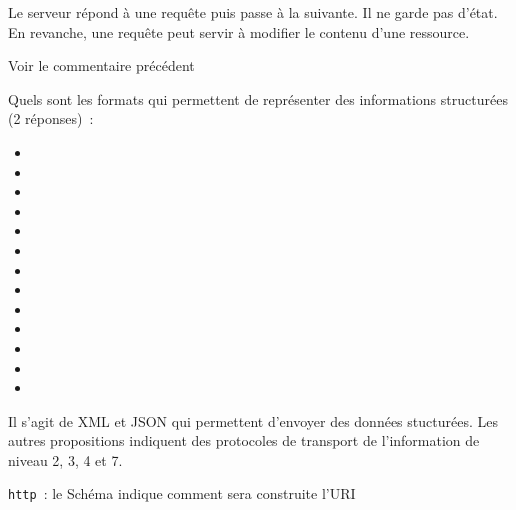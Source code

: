 {Le serveur répond à une requête puis passe à la suivante. Il ne garde pas d'état. En revanche, une requête peut servir à modifier le contenu d'une ressource.}

{Voir le commentaire précédent}

  {Quels sont les formats qui permettent de représenter des informations structurées (2 réponses)~: 
  \begin{multicols}{4}
  \begin{itemize}[label=$\square$]
   \item {}
   \item {}
   \item {}
   \item {}
   \item {}
   \item {}
   \item {}
   \item {}
   \item {} 
   \item {}
   \item {}
   \item {}
   \item {}
  \end{itemize}
  \end{multicols}
  }
  {Il s'agit de XML et JSON qui permettent d'envoyer des données stucturées. Les autres propositions indiquent des protocoles de transport de l'information de niveau 2, 3, 4 et 7.}
  
{\noindent\texttt{http}~: le Schéma indique comment sera construite l'URI}

